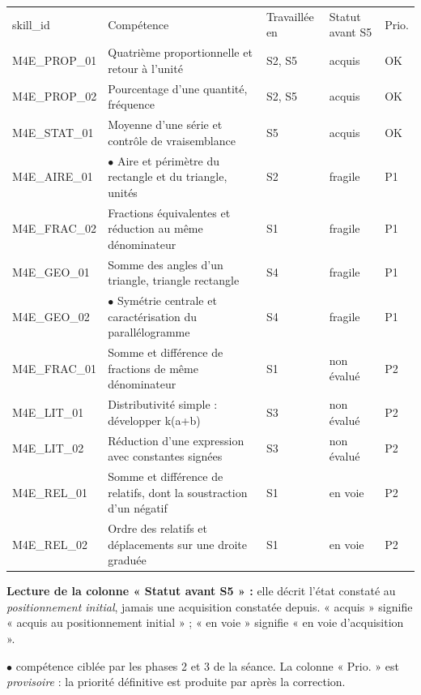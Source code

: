 \documentclass[10pt,a4paper]{article}
\begin{document}
\newpage{}
\par\noindent\begin{tabularx}{\linewidth}{>{\ttfamily\scriptsize}p{27mm} X >{\scriptsize}p{16mm} >{\scriptsize}p{20mm} >{\scriptsize\centering\arraybackslash}p{9mm}}
\rowcolor{Navy}\color{white}\scriptsize skill\_id & \color{white}Compétence & \color{white}Travaillée en & \color{white}Statut avant S5 & \color{white}Prio. \\
M4E\_PROP\_01 & Quatrième proportionnelle et retour à l'unité & S2, S5 & acquis & OK \\
M4E\_PROP\_02 & Pourcentage d'une quantité, fréquence & S2, S5 & acquis & OK \\
M4E\_STAT\_01 & Moyenne d'une série et contrôle de vraisemblance & S5 & acquis & OK \\
M4E\_AIRE\_01 & $\bullet$ Aire et périmètre du rectangle et du triangle, unités & S2 & fragile & P1 \\
M4E\_FRAC\_02 & Fractions équivalentes et réduction au même dénominateur & S1 & fragile & P1 \\
M4E\_GEO\_01 & Somme des angles d'un triangle, triangle rectangle & S4 & fragile & P1 \\
M4E\_GEO\_02 & $\bullet$ Symétrie centrale et caractérisation du parallélogramme & S4 & fragile & P1 \\
M4E\_FRAC\_01 & Somme et différence de fractions de même dénominateur & S1 & non évalué & P2 \\
M4E\_LIT\_01 & Distributivité simple : développer k(a+b) & S3 & non évalué & P2 \\
M4E\_LIT\_02 & Réduction d'une expression avec constantes signées & S3 & non évalué & P2 \\
M4E\_REL\_01 & Somme et différence de relatifs, dont la soustraction d'un négatif & S1 & en voie & P2 \\
M4E\_REL\_02 & Ordre des relatifs et déplacements sur une droite graduée & S1 & en voie & P2 \\
\end{tabularx}
\par\vspace{1mm}\small\textbf{Lecture de la colonne « Statut avant S5 » :} elle décrit l'état constaté au \emph{positionnement initial}, jamais une acquisition constatée depuis. « acquis » signifie « acquis au positionnement initial » ; « en voie » signifie « en voie d'acquisition ».
\par\small$\bullet$ compétence ciblée par les phases 2 et 3 de la séance. La colonne « Prio. » est \emph{provisoire} : la priorité définitive est produite par  après la correction.
\end{document}
